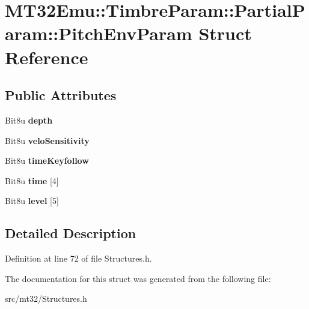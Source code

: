\hypertarget{structMT32Emu_1_1TimbreParam_1_1PartialParam_1_1PitchEnvParam}{\section{M\-T32\-Emu\-:\-:Timbre\-Param\-:\-:Partial\-Param\-:\-:Pitch\-Env\-Param Struct Reference}
\label{structMT32Emu_1_1TimbreParam_1_1PartialParam_1_1PitchEnvParam}
}
\subsection*{Public Attributes}
\begin{DoxyCompactItemize}
\item 
\hypertarget{structMT32Emu_1_1TimbreParam_1_1PartialParam_1_1PitchEnvParam_a7ce3f4718bfca49695df0a5a9536fdad}{Bit8u {\bfseries depth}}\label{structMT32Emu_1_1TimbreParam_1_1PartialParam_1_1PitchEnvParam_a7ce3f4718bfca49695df0a5a9536fdad}

\item 
\hypertarget{structMT32Emu_1_1TimbreParam_1_1PartialParam_1_1PitchEnvParam_a0d0939a83324b8997e57d391fc3813bc}{Bit8u {\bfseries velo\-Sensitivity}}\label{structMT32Emu_1_1TimbreParam_1_1PartialParam_1_1PitchEnvParam_a0d0939a83324b8997e57d391fc3813bc}

\item 
\hypertarget{structMT32Emu_1_1TimbreParam_1_1PartialParam_1_1PitchEnvParam_a9f1cb35bb86a4d86a03dc1f541a07d4c}{Bit8u {\bfseries time\-Keyfollow}}\label{structMT32Emu_1_1TimbreParam_1_1PartialParam_1_1PitchEnvParam_a9f1cb35bb86a4d86a03dc1f541a07d4c}

\item 
\hypertarget{structMT32Emu_1_1TimbreParam_1_1PartialParam_1_1PitchEnvParam_a2a83e7923ead6a976a146238a973bde3}{Bit8u {\bfseries time} \mbox{[}4\mbox{]}}\label{structMT32Emu_1_1TimbreParam_1_1PartialParam_1_1PitchEnvParam_a2a83e7923ead6a976a146238a973bde3}

\item 
\hypertarget{structMT32Emu_1_1TimbreParam_1_1PartialParam_1_1PitchEnvParam_a6564e6fb6a0a2ac350940d86dda0c23c}{Bit8u {\bfseries level} \mbox{[}5\mbox{]}}\label{structMT32Emu_1_1TimbreParam_1_1PartialParam_1_1PitchEnvParam_a6564e6fb6a0a2ac350940d86dda0c23c}

\end{DoxyCompactItemize}


\subsection{Detailed Description}


Definition at line 72 of file Structures.\-h.



The documentation for this struct was generated from the following file\-:\begin{DoxyCompactItemize}
\item 
src/mt32/Structures.\-h\end{DoxyCompactItemize}
